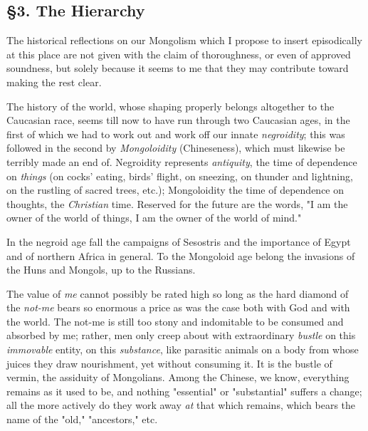 \medskip{}

\subsection[\S{}3. The Hierarchy]{\centering \S{}3. The Hierarchy}

The historical reflections on our Mongolism which I propose to insert 
episodically at this place are not given with the claim of thoroughness, or 
even of approved soundness, but solely because it seems to me that they may 
contribute toward making the rest clear.

The history of the world, whose shaping properly belongs altogether to the 
Caucasian race, seems till now to have run through two Caucasian ages, in the 
first of which we had to work out and work off our innate \textit{negroidity}; 
this was followed in the second by \textit{Mongoloidity} (Chineseness), which 
must likewise be terribly made an end of. Negroidity represents 
\textit{antiquity}, the time of dependence on \textit{things} (on cocks' 
eating, birds' flight, on sneezing, on thunder and lightning, on the rustling 
of sacred trees, etc.); Mongoloidity the time of dependence on thoughts, the 
\textit{Christian} time. Reserved for the future are the words, "{}I am the 
owner of the world of things, I am the owner of the world of mind."{}

In the negroid age fall the campaigns of Sesostris and the importance of Egypt 
and of northern Africa in general. To the Mongoloid age belong the invasions 
of the Huns and Mongols, up to the Russians.

The value of \textit{me} cannot possibly be rated high so long as the hard 
diamond of the \textit{not-me} bears so enormous a price as was the case both 
with God and with the world. The not-me is still too stony and indomitable to 
be consumed and absorbed by me; rather, men only creep about with 
extraordinary \textit{bustle} on this \textit{immovable} entity, on this 
\textit{substance}, like parasitic animals on a body from whose juices they 
draw nourishment, yet without consuming it. It is the bustle of vermin, the 
assiduity of Mongolians. Among the Chinese, we know, everything remains as it 
used to be, and nothing "{}essential"{} or "{}substantial"{} suffers a change; 
all the more actively do they work away \textit{at} that which remains, which 
bears the name of the "{}old,"{} "{}ancestors,"{} etc.

